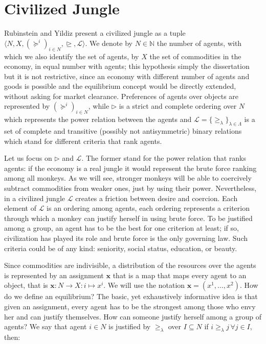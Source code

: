 \section{Civilized Jungle}

Rubinstein and Yildiz \cite{RY} present a civilized jungle as a tuple $\langle N,X,(\succeq^i)_{i\in N}, \trianglerighteq, \mathcal{L}\rangle$. We denote by $N\in\mathbb{N}$ the number of agents, with which we also identify the set of agents, by $X$ the set of commodities in the economy, in equal number with agents; this hypothesis simply the dissertation but it is not restrictive, since an economy with different number of agents and goods is possible and the equilibrium concept would be directly extended, without asking for market clearance. Preferences of agents over objects are represented by $(\succeq^i)_{i\in N}$, while $\triangleright$ is a strict and complete ordering over $N$ which represents the power relation between the agents and $\mathcal{L}=\{\geq_{\lambda}\}_{\lambda\in\Lambda}$ is a set of complete and transitive (possibly not antisymmetric) binary relations which stand for different criteria that rank agents. 

Let us focus on $\triangleright$ and $\mathcal{L}$. The former stand for the power relation that ranks agents: if the economy is a real jungle it would represent the brute force ranking among all monkeys. As we will see, stronger monkeys will be able to coercively subtract commodities from weaker ones, just by using their power. Nevertheless, in a civilized jungle $\mathcal{L}$ creates a friction between desire and coercion. Each element of $\mathcal{L}$ is an ordering among agents, each ordering represents a criterion through which a monkey can justify herself in using brute force. To be justified among a group, an agent has to be the best for one criterion at least; if so, civilization has played its role and brute force is the only governing law. Such criteria could be of any kind: seniority, social status, education, or beauty.  

Since commodities are indivisible, a distribution of the resources over the agents is represented by an assignment $\textbf{x}$ that is a map that maps every agent to an object, that is $\textbf{x}:N\rightarrow X:i\mapsto x^i$. We will use the notation $\textbf{x}=(x^1,\dots,x^2)$. How do we define an equilibrium? The basic, yet exhaustively informative idea is that given an assignment, every agent has to be the strongest among those who envy her and can justify themselves. How can someone justify herself among a group of agents? We say that agent $i\in N$ is justified by $\geq_{\lambda}$ over $I\subseteq N$ if $i\geq_{\lambda} j\,\forall j\in I$, then:

